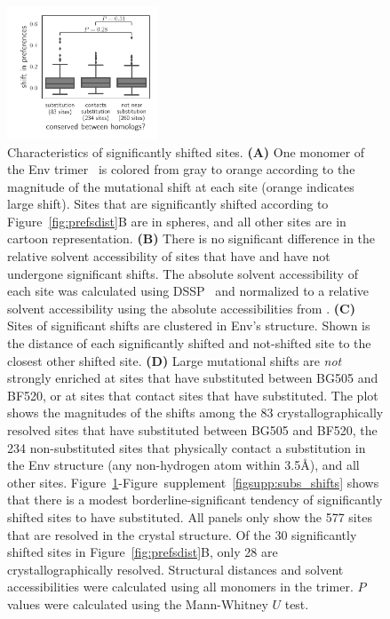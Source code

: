 \documentclass[9pt]{elife}
\newcommand{\angstrom}{\textup{\AA}}
\begin{document}
\begin{figure}
\hspace{0.01\textwidth}
\includegraphics[width=0.4\textwidth]{figures/conservation_vs_shifts.pdf} 
\caption{\label{fig:shiftfeatures}
Characteristics of significantly shifted sites.
{\bf (A)} One monomer of the Env trimer~\citep[PDB 5FYL;][]{stewart2016trimeric} is colored from gray to orange according to the magnitude of the mutational shift at each site (orange indicates large shift).
Sites that are significantly shifted according to Figure~\ref{fig:prefsdist}B are in spheres, and all other sites are in cartoon representation.
{\bf (B)} 
There is no significant difference in the relative solvent accessibility of sites that have and have not undergone significant shifts.
The absolute solvent accessibility of each site was calculated using DSSP~\citep{kabsch1983dictionary} and normalized to a relative solvent accessibility using the absolute accessibilities from \citet{tien2013maximum}.
{\bf (C)} 
Sites of significant shifts are clustered in Env's structure.
Shown is the distance of each significantly shifted and not-shifted site to the closest other shifted site.
{\bf (D)}
Large mutational shifts are \emph{not} strongly enriched at sites that have substituted between BG505 and BF520, or at sites that contact sites that have substituted. 
The plot shows the magnitudes of the shifts among the 83 crystallographically resolved sites that have substituted between BG505 and BF520, the 234 non-substituted sites that physically contact a substitution in the Env structure (any non-hydrogen atom within 3.5\angstrom), and all other sites.
Figure~\ref{fig:shiftfeatures}-Figure~supplement~\ref{figsupp:subs_shifts} shows that there is a modest borderline-significant tendency of significantly shifted sites to have substituted.
All panels only show the 577 sites that are resolved in the crystal structure.
Of the 30 significantly shifted sites in Figure~\ref{fig:prefsdist}B, only 28 are crystallographically resolved.
Structural distances and solvent accessibilities were calculated using all monomers in the trimer.
$P$ values were calculated using the Mann-Whitney $U$ test.
}
{}
\end{figure}
\end{document}
